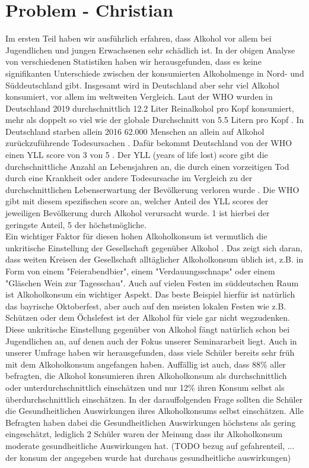 \documentclass[12pt]{article}
\begin{document}
\section{Problem \footnotesize{- Christian}}
Im ersten Teil haben wir ausführlich erfahren, dass Alkohol vor allem bei Jugendlichen und jungen Erwachsenen sehr schädlich ist. 
In der obigen Analyse von verschiedenen Statistiken haben wir herausgefunden, dass es keine signifikanten Unterschiede zwischen der konsumierten Alkoholmenge in Nord- und Süddeutschland gibt. Insgesamt wird in Deutschland aber sehr viel Alkohol konsumiert, vor allem im weltweiten Vergleich. Laut der WHO wurden in Deutschland 2019 durchschnittlich 12.2 Liter Reinalkohol pro Kopf konsumiert, mehr als doppelt so viel wie der globale Durchschnitt von 5.5 Litern pro Kopf \autocite{noauthor_alcohol_nodate-1}. In Deutschland starben allein 2016 62.000 Menschen an allein auf Alkohol zurückzuführende Todesursachen \autocite{noauthor_alkoholkonsum_nodate}. Dafür bekommt Deutschland von der WHO einen YLL score von 3 von 5 \autocite{noauthor_alcohol-attributable_nodate}. Der YLL (years of life lost) score gibt die durchschnittliche Anzahl an Lebensjahren an, die durch einen vorzeitigen Tod durch eine Krankheit oder andere Todesursache im Vergleich zu der durchschnittlichen Lebenserwartung der Bevölkerung verloren wurde \autocite[1368]{martinez_reflection_2019}. Die WHO gibt mit diesem spezifischen score an, welcher Anteil des YLL scores der jeweiligen Bevölkerung durch Alkohol verursacht wurde. 1 ist hierbei der geringste Anteil, 5 der höchstmögliche.\\
Ein wichtiger Faktor für diesen hohen Alkoholkonsum ist vermutlich die unkritische Einstellung der Gesellschaft gegenüber Alkohol \autocite{noauthor_alkoholkonsum_nodate}. Das zeigt sich daran, dass weiten Kreisen der Gesellschaft alltäglicher Alkoholkonsum üblich ist, z.B. in Form von einem "Feierabendbier", einem "Verdauungsschnaps" oder einem "Gläschen Wein zur Tagesschau". Auch auf vielen Festen im süddeutschen Raum ist Alkoholkonsum ein wichtiger Aspekt. Das beste Beispiel hierfür ist natürlich das bayrische Oktoberfest, aber auch auf den meisten lokalen Festen wie z.B. Schützen oder dem Öchslefest ist der Alkohol für viele gar nicht wegzudenken. Diese unkritische Einstellung gegenüber von Alkohol fängt natürlich schon bei Jugendlichen an, auf denen auch der Fokus unserer Seminararbeit liegt. Auch in unserer Umfrage haben wir herausgefunden, dass viele Schüler bereits sehr früh mit dem Alkoholkonsum angefangen haben. Auffällig ist auch, dass 88\% aller befragten, die Alkohol konsumieren ihren Alkoholkonsum als durchschnittlich oder unterdurchschnittlich einschätzen und nur 12\% ihren Konsum selbst als überdurchschnittlich einschätzen. In der darauffolgenden Frage sollten die Schüler die Gesundheitlichen Auswirkungen ihres Alkoholkonsums selbst einschätzen. Alle Befragten haben dabei die Gesundheitlichen Auswirkungen höchstens als gering eingeschätzt, lediglich 2 Schüler waren der Meinung dass ihr Alkoholkonsum moderate gesundheitliche Auswirkungen hat. (TODO bezug auf gefahrenteil, ... der konsum der angegeben wurde hat durchaus gesundheitliche auswirkungen)\\
\end{document}
